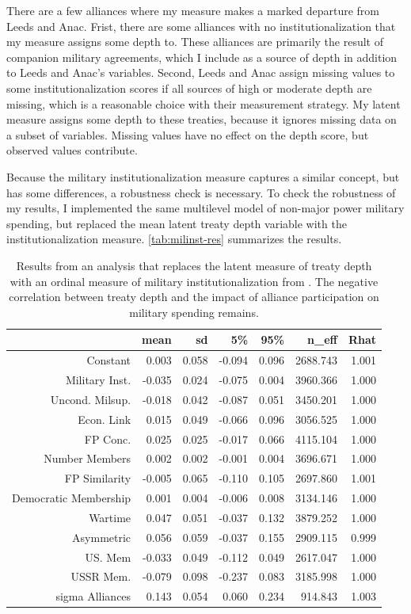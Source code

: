\documentclass[12pt]{article}
\begin{document}
There are a few alliances where my measure makes a marked departure from Leeds and Anac. 
Frist, there are some alliances with no institutionalization that my measure assigns some depth to. 
These alliances are primarily the result of companion military agreements, which I include as a source of depth in addition to Leeds and Anac's variables. 
Second, Leeds and Anac assign missing values to some institutionalization scores if all sources of high or moderate depth are missing, which is a reasonable choice with their measurement strategy.
My latent measure assigns some depth to these treaties, because it ignores missing data on a subset of variables. 
Missing values have no effect on the depth score, but observed values contribute. 


Because the military institutionalization measure captures a similar concept, but has some differences, a robustness check is necessary. 
To check the robustness of my results, I implemented the same multilevel model of non-major power military spending, but replaced the mean latent treaty depth variable with the institutionalization measure. 
\autoref{tab:milinst-res} summarizes the results. 


\begin{table}[ht]
\centering
\begin{tabular}{rrrrrrr}
  \hline
 & mean & sd & 5\% & 95\% & n\_eff & Rhat \\ 
  \hline
Constant & 0.003 & 0.058 & -0.094 & 0.096 & 2688.743 & 1.001 \\ 
  Military Inst. & -0.035 & 0.024 & -0.075 & 0.004 & 3960.366 & 1.000 \\ 
  Uncond. Milsup. & -0.018 & 0.042 & -0.087 & 0.051 & 3450.201 & 1.000 \\ 
  Econ. Link & 0.015 & 0.049 & -0.066 & 0.096 & 3056.525 & 1.000 \\ 
  FP Conc. & 0.025 & 0.025 & -0.017 & 0.066 & 4115.104 & 1.000 \\ 
  Number Members & 0.002 & 0.002 & -0.001 & 0.004 & 3696.671 & 1.000 \\ 
  FP Similarity & -0.005 & 0.065 & -0.110 & 0.105 & 2697.860 & 1.001 \\ 
  Democratic Membership & 0.001 & 0.004 & -0.006 & 0.008 & 3134.146 & 1.000 \\ 
  Wartime & 0.047 & 0.051 & -0.037 & 0.132 & 3879.252 & 1.000 \\ 
  Asymmetric & 0.056 & 0.059 & -0.037 & 0.155 & 2909.115 & 0.999 \\ 
  US. Mem & -0.033 & 0.049 & -0.112 & 0.049 & 2617.047 & 1.000 \\ 
  USSR Mem. & -0.079 & 0.098 & -0.237 & 0.083 & 3185.998 & 1.000 \\ 
  sigma Alliances & 0.143 & 0.054 & 0.060 & 0.234 & 914.843 & 1.003 \\ 
   \hline
\end{tabular}
\caption{Results from an analysis that replaces the latent measure of treaty depth with an ordinal measure of military institutionalization from \citet{LeedsAnac2005}. The negative correlation between treaty depth and the impact of alliance participation on military spending remains.}
\label{tab:milinst-res}
\end{table}
\end{document}
